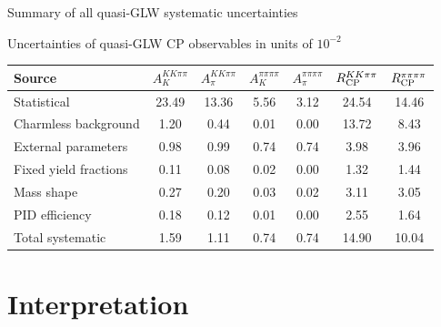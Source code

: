 \documentclass{beamer}
\begin{document}
\begin{frame}{Summary of all quasi-GLW systematic uncertainties}
  \begin{center}
    Uncertainties of quasi-GLW CP observables in units of $10^{-2}$
  \end{center}
  \footnotesize
  \vspace{0.02cm}
  \begin{center}
    \begin{tabular}{lcccccc} 
      \hline
      Source & $A_K^{KK\pi\pi}$ & $A_\pi^{KK\pi\pi}$ & $A_K^{\pi\pi\pi\pi}$ & $A_\pi^{\pi\pi\pi\pi}$ & $R_{\rm CP}^{KK\pi\pi}$ & $R_{\rm CP}^{\pi\pi\pi\pi}$ \\
      \hline
      Statistical                                   & 23.49 & 13.36 &  5.56 &  3.12 & 24.54 & 14.46 \\
      \hline
      Charmless background                          &  1.20 &  0.44 &  0.01 &  0.00 & 13.72 &  8.43 \\
      External parameters                           &  0.98 &  0.99 &  0.74 &  0.74 &  3.98 &  3.96 \\
      Fixed yield fractions                         &  0.11 &  0.08 &  0.02 &  0.00 &  1.32 &  1.44 \\
      Mass shape                                    &  0.27 &  0.20 &  0.03 &  0.02 &  3.11 &  3.05 \\
      PID efficiency                                &  0.18 &  0.12 &  0.01 &  0.00 &  2.55 &  1.64 \\
      \hline
      Total systematic                              &  1.59 &  1.11 &  0.74 &  0.74 & 14.90 & 10.04 \\
      \hline
    \end{tabular}
  \end{center}
\end{frame}

\section{Interpretation}
\end{document}
